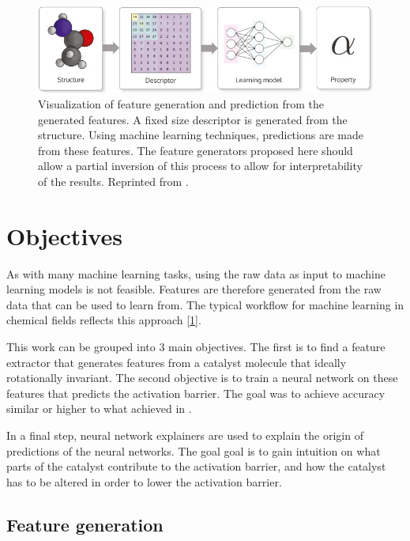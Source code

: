 \begin{figure}[H]
  \centering
  \includegraphics[width=12cm]{figures/introduction/chem-descriptor.jpg}
  \caption[Machine learning in chemistry]{Visualization of feature generation and prediction from the generated features. 
  A fixed size descriptor is generated from the structure. Using machine learning techniques, 
  predictions are made from these features.
  The feature generators proposed here should allow a partial inversion of this process to allow for interpretability of the results.
  Reprinted from \cite{dscribe}.}
  \label{fig:feature-process}
\end{figure}

\section{Objectives}

As with many machine learning tasks, using the raw data as input to machine learning models is not feasible.
Features are therefore generated from the raw data that can be used to learn from.
The typical workflow for machine learning in chemical fields reflects this approach [\ref{fig:feature-process}].

This work can be grouped into 3 main objectives. 
The first is to find a feature extractor that generates features from a catalyst molecule that ideally rotationally invariant.
The second objective is to train a neural network on these features that predicts the activation barrier.
The goal was to achieve accuracy similar or higher to what \citeauthor{friederich_dos} achieved in \cite{friederich_dos}.

In a final step, neural network explainers are used to explain the origin of predictions of the neural networks.
The goal goal is to gain intuition on what parts of the catalyst contribute to the activation barrier, 
and how the catalyst has to be altered in order to lower the activation barrier.


\subsection{Feature generation}

